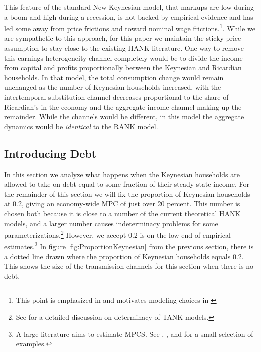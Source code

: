 \documentclass[12pt,a4paper]{article}
\begin{document}
This feature of the standard New Keynesian model, that markups are low during a boom and high during a recession, is not backed by empirical evidence and has led some away from price frictions and toward nominal wage frictions.\footnote{This point is emphasized in \cite{broer_2018} and motivates modeling choices in \cite{auclert_inequality_2018}}. While we are sympathetic to this approach, for this paper we maintain the sticky price assumption to stay close to the existing HANK literature. One way to remove this earnings heterogeneity channel completely would be to divide the income from capital and profits proportionally between the Keynesian and Ricardian households. In that model, the total consumption change would remain unchanged as the number of Keynesian households increased, with the intertemporal substitution channel decreases proportional to the share of Ricardian's in the economy and the aggregate income channel making up the remainder. While the channels would be different, in this model the aggregate dynamics would be \textit{identical} to the RANK model.

\subsection{Introducing Debt}
In this section we analyze what happens when the Keynesian households are allowed to take on debt equal to some fraction of their steady state income. For the remainder of this section we will fix the proportion of Keynesian households at 0.2, giving an economy-wide MPC of just over 20 percent. This number is chosen both because it is close to a number of the current theoretical HANK models, and a larger number causes indeterminacy problems for some parameterizations.\footnote{See \cite{gali_2004} for a detailed discussion on determinacy of TANK models.} However, we accept 0.2 is on the low end of empirical estimates.\footnote{A large literature aims to estimate MPCS. See \cite{johnson_household_2006}, \cite{parker_consumer_2013}, \cite{fagereng_mpc_2016} and \cite{ckConsumption} for a small selection of examples.} In figure \ref{fig:ProportionKeynesian} from the previous section, there is a dotted line drawn where the proportion of Keynesian households equals 0.2. This shows the size of the transmission channels for this section when there is no debt.
\end{document}

